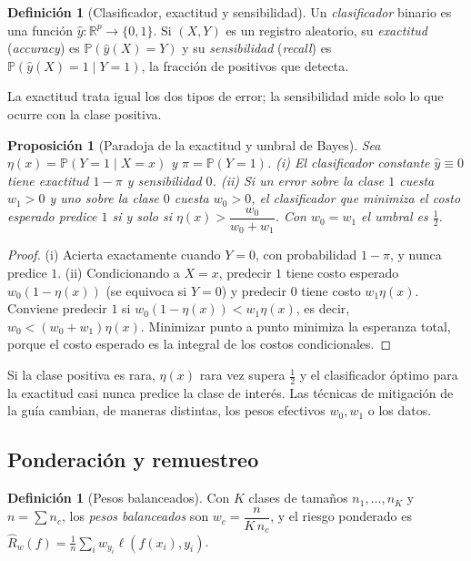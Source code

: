 \documentclass[11pt]{article}
\newtheorem{proposicion}[teorema]{Proposición}
\theoremstyle{definition}
\newtheorem{definicion}[teorema]{Definición}
\theoremstyle{remark}
\newcommand{\R}{\mathbb{R}}
\newcommand{\Prob}{\mathbb{P}}
\begin{document}
\begin{definicion}[Clasificador, exactitud y sensibilidad]\label{def:exactitud}
\noindent Un \emph{clasificador} binario es una función $\hat y:\R^p\to\{0,1\}$. Si $(X,Y)$ es un registro aleatorio, su \emph{exactitud} (\emph{accuracy}) es $\Prob(\hat y(X)=Y)$ y su \emph{sensibilidad} (\emph{recall}) es $\Prob(\hat y(X)=1\mid Y=1)$, la fracción de positivos que detecta.
\end{definicion}

\noindent La exactitud trata igual los dos tipos de error; la sensibilidad mide solo lo que ocurre con la clase positiva.

\begin{proposicion}[Paradoja de la exactitud y umbral de Bayes]\label{prop:paradoja}
\noindent Sea $\eta(x)=\Prob(Y=1\mid X=x)$ y $\pi=\Prob(Y=1)$. (i) El clasificador constante $\hat y\equiv0$ tiene exactitud $1-\pi$ y sensibilidad $0$. (ii) Si un error sobre la clase $1$ cuesta $w_1>0$ y uno sobre la clase $0$ cuesta $w_0>0$, el clasificador que minimiza el costo esperado predice $1$ si y solo si $\eta(x)>\dfrac{w_0}{w_0+w_1}$. Con $w_0=w_1$ el umbral es $\frac12$.
\end{proposicion}
\begin{proof}
\noindent (i) Acierta exactamente cuando $Y=0$, con probabilidad $1-\pi$, y nunca predice $1$. (ii) Condicionando a $X=x$, predecir $1$ tiene costo esperado $w_0(1-\eta(x))$ (se equivoca si $Y=0$) y predecir $0$ tiene costo $w_1\eta(x)$. Conviene predecir $1$ si $w_0(1-\eta(x))<w_1\eta(x)$, es decir, $w_0<(w_0+w_1)\eta(x)$. Minimizar punto a punto minimiza la esperanza total, porque el costo esperado es la integral de los costos condicionales.
\end{proof}

\noindent Si la clase positiva es rara, $\eta(x)$ rara vez supera $\frac12$ y el clasificador óptimo para la exactitud casi nunca predice la clase de interés. Las técnicas de mitigación de la guía cambian, de maneras distintas, los pesos efectivos $w_0,w_1$ o los datos.

\subsection{Ponderación y remuestreo}\label{sec:ponderacion}

\begin{definicion}[Pesos balanceados]\label{def:pesos}
\noindent Con $K$ clases de tamaños $n_1,\dots,n_K$ y $n=\sum n_c$, los \emph{pesos balanceados} son $w_c=\dfrac{n}{K\,n_c}$, y el riesgo ponderado es $\hat R_w(f)=\frac1n\sum_iw_{y_i}\ell(f(x_i),y_i)$.
\end{definicion}
\end{document}

